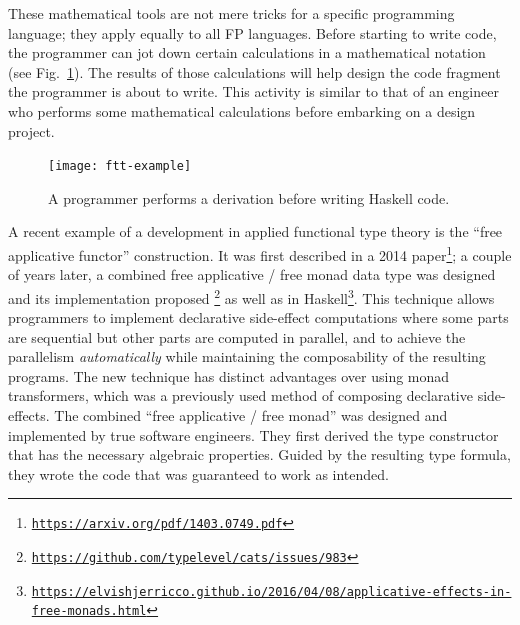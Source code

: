 These mathematical tools are not mere tricks for a specific programming
language; they apply equally to all FP languages. Before starting
to write code, the programmer can jot down certain calculations in
a mathematical notation (see Fig.\ \ref{fig:Example-calculation-in-type-theory}).
The results of those calculations will help design the code fragment
the programmer is about to write. This activity is similar to that
of an engineer who performs some mathematical calculations before
embarking on a design project. \begin{figure}%
\begin{centering}
{\footnotesize{}\vspace{0.25\baselineskip}
\texttt{[image: ftt-example]}\vspace{-0.25\baselineskip}
}{\footnotesize\par}
\par\end{centering}
{\footnotesize{}\caption{A programmer performs a derivation before writing Haskell code.\label{fig:Example-calculation-in-type-theory}}
}{\footnotesize\par}

\vspace{-0.5\baselineskip}
\end{figure}%
 

A recent example of a development in applied functional type theory
is the \textsf{``}free applicative functor\textsf{''} construction. It was first described
in a 2014 paper\footnote{\texttt{\href{https://arxiv.org/pdf/1403.0749.pdf}{https://arxiv.org/pdf/1403.0749.pdf}}};
a couple of years later, a combined free applicative / free monad
data type was designed and its implementation proposed \footnote{\texttt{\href{https://github.com/typelevel/cats/issues/983}{https://github.com/typelevel/cats/issues/983}}}
as well as in Haskell\footnote{\texttt{\href{https://elvishjerricco.github.io/2016/04/08/applicative-effects-in-free-monads.html}{https://elvishjerricco.github.io/2016/04/08/applicative-effects-in-free-monads.html}}}.
This technique allows programmers to implement declarative side-effect
computations where some parts are sequential but other parts are computed
in parallel, and to achieve the parallelism \emph{automatically} while
maintaining the composability of the resulting programs. The new technique
has distinct advantages over using monad transformers, which was a
previously used method of composing declarative side-effects. The
combined \textsf{``}free applicative / free monad\textsf{''} was designed and implemented
by true software engineers. They first derived the type constructor
that has the necessary algebraic properties. Guided by the resulting
type formula, they wrote the code that was guaranteed to work as intended.

